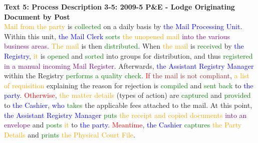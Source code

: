 \textbf{Text 5: Process Description 3-5: 2009-5 P\&E - Lodge Originating Document by Post}\\
\textcolor{orange}{Mail} \textcolor{orange}{from} \textcolor{orange}{the} \textcolor{orange}{party} is \textcolor{green}{collected} on a daily basis by \textcolor{blue}{the} \textcolor{blue}{Mail} \textcolor{blue}{Processing} \textcolor{blue}{Unit}. Within this unit, \textcolor{blue}{the} \textcolor{blue}{Mail} \textcolor{blue}{Clerk} \textcolor{green}{sorts} \textcolor{orange}{the} \textcolor{orange}{unopened} \textcolor{orange}{mail} \textcolor{purple}{into} \textcolor{purple}{the} \textcolor{purple}{various} \textcolor{purple}{business} \textcolor{purple}{areas}. \textcolor{orange}{The} \textcolor{orange}{mail} is then \textcolor{green}{distributed}. When \textcolor{orange}{the} \textcolor{orange}{mail} is \textcolor{green}{received} by \textcolor{blue}{the} \textcolor{blue}{Registry}, \textcolor{orange}{it} is \textcolor{green}{opened} and \textcolor{green}{sorted} into groups for distribution, and thus \textcolor{green}{registered} \textcolor{purple}{in} \textcolor{purple}{a} \textcolor{purple}{manual} \textcolor{purple}{incoming} \textcolor{purple}{Mail} \textcolor{purple}{Register}. Afterwards, \textcolor{blue}{the} \textcolor{blue}{Assistant} \textcolor{blue}{Registry} \textcolor{blue}{Manager} within the Registry \textcolor{green}{performs} \textcolor{green}{a} \textcolor{green}{quality} \textcolor{green}{check}. \textcolor{red}{If} \textcolor{brown}{the} \textcolor{brown}{mail} \textcolor{brown}{is} \textcolor{brown}{not} \textcolor{brown}{compliant}, \textcolor{orange}{a} \textcolor{orange}{list} \textcolor{orange}{of} \textcolor{orange}{requisition} explaining the reason for rejection is \textcolor{green}{compiled} and \textcolor{green}{sent} \textcolor{green}{back} to \textcolor{blue}{the} \textcolor{blue}{party}. \textcolor{red}{Otherwise}, \textcolor{orange}{the} \textcolor{orange}{matter} \textcolor{orange}{details} (types of action) are \textcolor{green}{captured} and \textcolor{green}{provided} to \textcolor{blue}{the} \textcolor{blue}{Cashier}, \textcolor{blue}{who} \textcolor{green}{takes} the applicable fees attached to the mail. At this point, \textcolor{blue}{the} \textcolor{blue}{Assistant} \textcolor{blue}{Registry} \textcolor{blue}{Manager} \textcolor{green}{puts} \textcolor{orange}{the} \textcolor{orange}{receipt} \textcolor{orange}{and} \textcolor{orange}{copied} \textcolor{orange}{documents} \textcolor{purple}{into} \textcolor{purple}{an} \textcolor{purple}{envelope} and \textcolor{green}{posts} \textcolor{orange}{it} to \textcolor{blue}{the} \textcolor{blue}{party}. \textcolor{red}{Meantime}, \textcolor{blue}{the} \textcolor{blue}{Cashier} \textcolor{green}{captures} \textcolor{orange}{the} \textcolor{orange}{Party} \textcolor{orange}{Details} and \textcolor{green}{prints} \textcolor{orange}{the} \textcolor{orange}{Physical} \textcolor{orange}{Court} \textcolor{orange}{File}.

